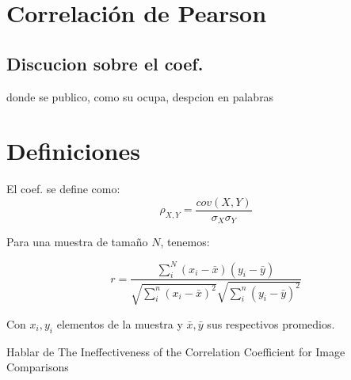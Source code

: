 \section[]{Correlaci\'on de Pearson}

	\subsection{Discucion sobre el coef.}
	
		donde se publico, como su ocupa, despcion en palabras
	 
	\section{Definiciones}
	
	El coef. se define como:
	\begin{equation}\label{pearson_orig}
		\rho_{X,Y}=\frac{cov(X,Y)}{\sigma_X\sigma_Y}
	\end{equation}
	
	Para una muestra de tama\~no $N$, tenemos:
	
	\begin{equation}\label{pearson_r}
		r=\frac{\sum_{i}^N\left(x_{i}-\bar{x}\right)\left(y_{i}-\bar{y}\right)}{\sqrt{\sum_{i}^n\left(x_{i}-\bar{x}\right)^{2}} \sqrt{\sum_{i}^n\left(y_{i}-\bar{y}\right)^{2}}}
	\end{equation}
	
	Con $x_i,y_i$ elementos de la muestra y $\bar{x},\bar{y}$ sus respectivos promedios.
	
	Hablar de The Ineffectiveness of the Correlation Coefficient for Image Comparisons
	
	\newpage